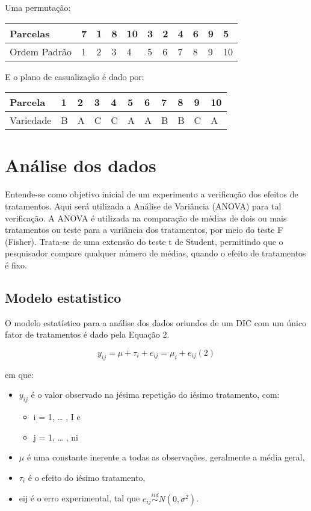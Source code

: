 \documentclass[
]{book}
\providecommand{\tightlist}{%
  \setlength{\itemsep}{0pt}\setlength{\parskip}{0pt}}
\begin{document}
Uma permutação:

\begin{longtable}[]{@{}lllllllllll@{}}
\toprule()
Parcelas & 7 & 1 & 8 & 10 & 3 & 2 & 4 & 6 & 9 & 5 \\
\midrule()
\endhead
Ordem Padrão & 1 & 2 & 3 & 4 & 5 & 6 & 7 & 8 & 9 & 10 \\
\bottomrule()
\end{longtable}

E o plano de casualização é dado por:

\begin{longtable}[]{@{}lllllllllll@{}}
\toprule()
Parcela & 1 & 2 & 3 & 4 & 5 & 6 & 7 & 8 & 9 & 10 \\
\midrule()
\endhead
Variedade & B & A & C & C & A & A & B & B & C & A \\
\bottomrule()
\end{longtable}

\hypertarget{anuxe1lise-dos-dados}{%
\section{Análise dos dados}\label{anuxe1lise-dos-dados}}

Entende-se como objetivo inicial de um experimento a verificação dos efeitos de tratamentos. Aqui será utilizada a Análise de Variância (ANOVA) para tal verificação. A ANOVA é utilizada na comparação de médias de dois ou mais tratamentos ou teste para a variância dos tratamentos, por meio do teste F (Fisher). Trata-se de uma extensão do teste t de Student, permitindo que o pesquisador compare qualquer número de médias, quando o efeito de tratamentos é fixo.

\hypertarget{modelo-estatistico}{%
\subsection{Modelo estatistico}\label{modelo-estatistico}}

O modelo estatístico para a análise dos dados oriundos de um DIC com um único fator de tratamentos é dado pela Equação 2.

\[y_{ij} = \mu + \tau_i + e_{ij} = \mu_i + e_{ij} (2)\]

em que:

\begin{itemize}
\item
  \(y_{ij}\) é o valor observado na jésima repetição do iésimo tratamento, com:

  \begin{itemize}
  \tightlist
  \item
    i = 1, \ldots{} , I e
  \item
    j = 1, \ldots{} , ni
  \end{itemize}
\item
  \(\mu\) é uma constante inerente a todas as observações, geralmente a média geral,
\item
  \(\tau_i\) é o efeito do iésimo tratamento,
\item
  eij é o erro experimental, tal que \(e_{ij} \overset{iid}{\sim} N(0,\sigma^2)\).
\end{itemize}
\end{document}

